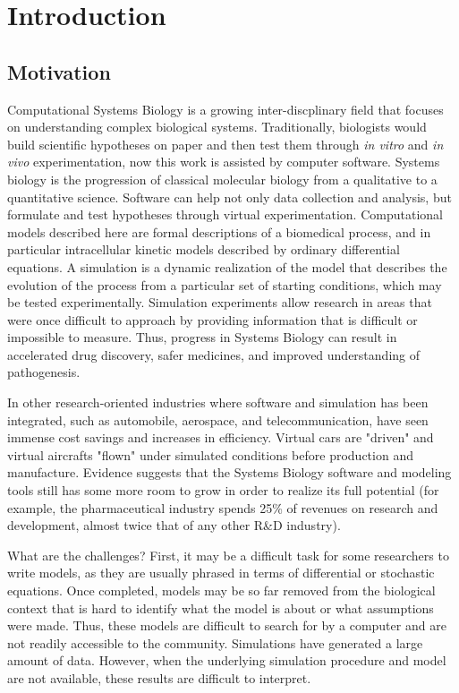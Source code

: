 \chapter{Introduction}

\section{Motivation}

Computational Systems Biology is a growing inter-discplinary field that focuses on understanding complex biological systems. \autocite{kitano2002computational}
Traditionally, biologists would build scientific hypotheses on paper and then test them through \textit{in vitro} and \textit{in vivo} experimentation, now this work is assisted by computer software.
Systems biology is the progression of classical molecular biology from a qualitative to a quantitative science.
Software can help not only data collection and analysis, but formulate and test hypotheses through virtual experimentation.
Computational models described here are formal descriptions of a biomedical process, and in particular intracellular kinetic models described by ordinary differential equations.
A simulation is a dynamic realization of the model that describes the evolution of the process from a particular set of starting conditions, which may be tested experimentally.
Simulation experiments allow research in areas that were once difficult to approach by providing information that is difficult or impossible to measure. \autocite{edwards2001silico}
Thus, progress in Systems Biology can result in accelerated drug discovery, safer medicines, and improved understanding of pathogenesis. \autocite{kitano2010grand, mack2004can}

In other research-oriented industries where software and simulation has been integrated, such as automobile, aerospace, and telecommunication, have seen immense cost savings and increases in efficiency.
Virtual cars are "driven" and virtual aircrafts "flown" under simulated conditions before production and manufacture. \autocite{ghosh2010connecting}
Evidence suggests that the Systems Biology software and modeling tools still has some more room to grow in order to realize its full potential (for example, the pharmaceutical industry spends 25\% of revenues on research and development, almost twice that of any other R\&D industry). \autocite{economist2005models}

What are the challenges?
First, it may be a difficult task for some researchers to write models, as they are usually phrased in terms of differential or stochastic equations.
Once completed, models may be so far removed from the biological context that is hard to identify what the model is about or what assumptions were made.
Thus, these models are difficult to search for by a computer and are not readily accessible to the community.
Simulations have generated a large amount of data.
However, when the underlying simulation procedure and model are not available, these results are difficult to interpret.

